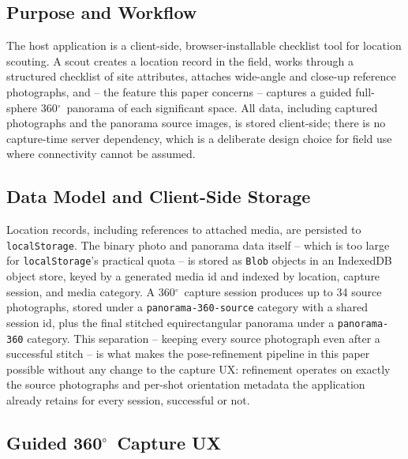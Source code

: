 \documentclass[11pt]{article}
\newcommand{\Deg}{\ensuremath{^{\circ}}}
\begin{document}
\subsection{Purpose and Workflow}

The host application is a client-side, browser-installable checklist tool for location scouting. A scout creates a location record in the field, works through a structured checklist of site attributes, attaches wide-angle and close-up reference photographs, and -- the feature this paper concerns -- captures a guided full-sphere 360\Deg\ panorama of each significant space. All data, including captured photographs and the panorama source images, is stored client-side; there is no capture-time server dependency, which is a deliberate design choice for field use where connectivity cannot be assumed.

\subsection{Data Model and Client-Side Storage}

Location records, including references to attached media, are persisted to \texttt{localStorage}. The binary photo and panorama data itself -- which is too large for \texttt{localStorage}'s practical quota -- is stored as \texttt{Blob} objects in an IndexedDB object store, keyed by a generated media id and indexed by location, capture session, and media category. A 360\Deg\ capture session produces up to 34 source photographs, stored under a \texttt{panorama-360-source} category with a shared session id, plus the final stitched equirectangular panorama under a \texttt{panorama-360} category. This separation -- keeping every source photograph even after a successful stitch -- is what makes the pose-refinement pipeline in this paper possible without any change to the capture UX: refinement operates on exactly the source photographs and per-shot orientation metadata the application already retains for every session, successful or not.

\subsection{Guided 360\Deg\ Capture UX}
\label{sec:captureux}
\end{document}
